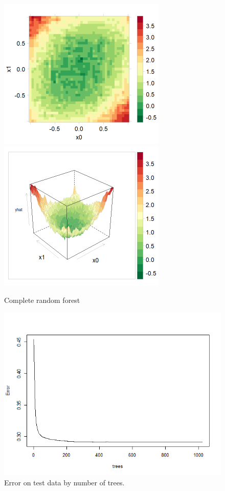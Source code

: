 \documentclass[10pt,openany]{article}
\numberwithin{definition}{section}
\numberwithin{example}{section}
\numberwithin{equation}{section}
\numberwithin{figure}{section}
\begin{document}
\begin{figure}
\noindent \begin{centering}
\includegraphics[width=80mm]{fig/rf-1024-tree-levelplot}~
\includegraphics[width=80mm]{fig/rf-1024-tree-wireframe}
\par\end{centering}

\protect\caption{\label{fig:random-forest}Complete random forest}
\end{figure}
\begin{figure}
\noindent \begin{centering}
\includegraphics[width=12cm]{fig/rf-1024-tree-forest}
\par\end{centering}

\protect\caption{
\label{fig:Error-on-independent}Error on test data by number of trees.}
\end{figure}
\end{document}
